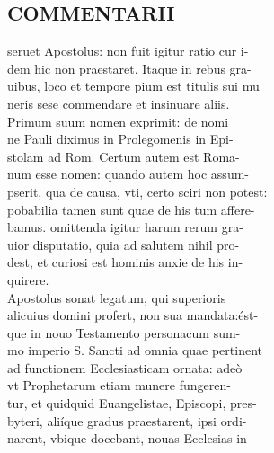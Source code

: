\documentclass{article}
\begin{document}
\begin{pages}
\section*{COMMENTARII \\
                }seruet Apostolus: non fuit igitur ratio cur i- \\
                dem hic non praestaret. Itaque in rebus gra- \\
                uibus, loco et tempore pium est titulis sui mu \\
                neris sese commendare et insinuare aliis. \\
                Primum suum nomen exprimit: de nomi \\
                ne Pauli diximus in Prolegomenis in Epi- \\
                stolam ad Rom. Certum autem est Roma- \\
                num esse nomen: quando autem hoc assum- \\
                pserit, qua de causa, vti, certo sciri non potest: \\
                pobabilia tamen sunt quae de his tum affere- \\
                bamus. omittenda igitur harum rerum gra- \\
                uior disputatio, quia ad salutem nihil pro- \\
                dest, et curiosi est hominis anxie de his in- \\
                quirere. \\
                Apostolus sonat legatum, qui superioris \\
                alicuius domini profert, non sua mandata:ést- \\
                que in nouo Testamento personacum sum- \\
                mo imperio S. Sancti ad omnia quae pertinent \\
                ad functionem Ecclesiasticam ornata: adeò \\
                vt Prophetarum etiam munere fungeren- \\
                tur, et quidquid Euangelistae, Episcopi, pres- \\
                byteri, aliíque gradus praestarent, ipsi ordi- \\
                narent, vbique docebant, nouas Ecclesias in- \\

\end{pages}
\end{document}
